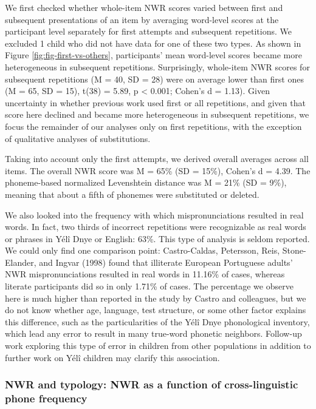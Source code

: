 \documentclass[
  english,
  ,man,floatsintext]{apa6}
\begin{document}
We first checked whether whole-item NWR scores varied between first and subsequent presentations of an item by averaging word-level scores at the participant level separately for first attempts and subsequent repetitions. We excluded 1 child who did not have data for one of these two types. As shown in Figure \ref{fig:fig-first-vs-others}, participants' mean word-level scores became more heterogeneous in subsequent repetitions. Surprisingly, whole-item NWR scores for subsequent repetitions (M = 40, SD = 28)
were on average lower than first ones (M = 65, SD = 15), t(38) = 5.89, p \textless{} 0.001; Cohen's d = 1.13). Given uncertainty in whether previous work used first or all repetitions, and given that score here declined and became more heterogeneous in subsequent repetitions, we focus the remainder of our analyses only on first repetitions, with the exception of qualitative analyses of substitutions.

Taking into account only the first attempts, we derived overall averages across all items. The overall NWR score was M = 65\% (SD = 15\%), Cohen's d = 4.39. The phoneme-based normalized Levenshtein distance was M = 21\% (SD = 9\%), meaning that about a fifth of phonemes were substituted or deleted.

We also looked into the frequency with which mispronunciations resulted in real words. In fact, two thirds of incorrect repetitions were recognizable as real words or phrases in Yélî Dnye or English: 63\%. This type of analysis is seldom reported. We could only find one comparison point: Castro-Caldas, Petersson, Reis, Stone-Elander, and Ingvar (1998) found that illiterate European Portuguese adults' NWR mispronunciations resulted in real words in 11.16\% of cases, whereas literate participants did so in only 1.71\% of cases. The percentage we observe here is much higher than reported in the study by Castro and colleagues, but we do not know whether age, language, test structure, or some other factor explains this difference, such as the particularities of the Yélî Dnye phonological inventory, which lead any error to result in many true-word phonetic neighbors. Follow-up work exploring this type of error in children from other populations in addition to further work on Yélî children may clarify this association.

\hypertarget{nwr-and-typology-nwr-as-a-function-of-cross-linguistic-phone-frequency}{%
\subsubsection{NWR and typology: NWR as a function of cross-linguistic phone frequency}\label{nwr-and-typology-nwr-as-a-function-of-cross-linguistic-phone-frequency}}
\end{document}

